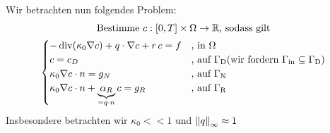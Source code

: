 Wir betrachten nun folgendes Problem:
\begin{gather*}
	\text{Bestimme } c:[0,T] \times \Omega \to \mathbb{R} \text{, sodass gilt}\\
	\begin{cases}
		- \operatorname{div}(\kappa_0 \nabla c) + q \cdot \nabla c + r \, c = f &\text{, in } \Omega\\
		c = c_D &\text{, auf } \Gamma_{\text{D}} (\text{wir fordern } \Gamma_{{\text{in}}} \subseteq \Gamma_{\text{D}})\\
		\kappa_0 \nabla c \cdot n = g_N &\text{, auf } \Gamma_{\text{N}}\\
		\kappa_0 \nabla c \cdot n  + \underbrace{\alpha_R}_{= q \cdot n} c = g_R &\text{, auf } \Gamma_{\text{R}}
	\end{cases}
\end{gather*}
Insbesondere betrachten wir $ \kappa_0 << 1 $ und $ \norm{q}_\infty \approx 1 $


